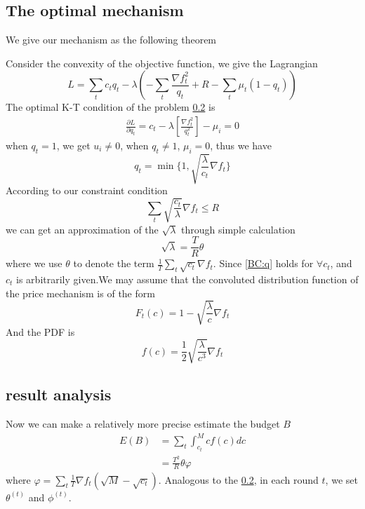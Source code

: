 \documentclass[10pt,conference,compsocconf,letterpaper]{IEEEtran}
\begin{document}
\subsection{The optimal mechanism}
We give our mechanism as the following theorem

\begin{IEEEproof}
Consider the convexity of the objective function, we give the Lagrangian
\begin{equation}
L=\sum_t c_t q_t -\lambda(-\sum_t\frac{\nabla f_t^2}{q_t}+R-\sum_t\mu_t(1-q_t))
\end{equation}
The optimal K-T condition of the problem \ref{} is 
\begin{align}
\frac{\partial L}{\partial q_t}=c_t-\lambda[\frac{\nabla f_t^2}{q_t^2}]-\mu_i=0
\end{align}
when $q_t=1$, we get $u_i\neq 0$, when $q_t\neq 1$, $\mu_i=0$, thus we have
\begin{equation}\label{BC:q}
q_t=\min\{1,\sqrt{\frac{\lambda}{c_t}}\nabla f_t\}
\end{equation}
According to our constraint condition
\begin{equation}
\sum_t \sqrt{\frac{c_t}{\lambda}}\nabla f_t\leq R
\end{equation}
we can get an approximation of the $\sqrt{\lambda}$ through simple calculation
\begin{equation}
\sqrt{\lambda}=\frac{T}{R}\theta
\end{equation}
where we use $\theta$ to denote the term $\frac{1}{T}\sum_t\sqrt{c_t}\nabla f_t$.
Since \ref{BC:q} holds for $\forall c_t$, and $c_t$ is arbitrarily given.We may assume that the convoluted distribution function of the price mechanism is of the form 
\begin{equation}
F_t(c)=1-\sqrt{\frac{\lambda}{c}}\nabla f_t
\end{equation}
And the PDF is 
\begin{equation}
f(c)=\frac{1}{2}\sqrt{\frac{{\lambda}}{c^3}}\nabla f_t
\end{equation}
\end{IEEEproof}
\subsection{result analysis}
Now we can make a relatively more precise estimate the budget $B$
\begin{align}
E(B)&=\sum_t\int_{c_t}^Mcf(c)dc\\
&=\frac{T^2}{R}\theta\varphi
\end{align}
where $\varphi=\sum_t\frac{1}{T}\nabla f_t(\sqrt{M}-\sqrt{c_t})$. Analogous to the \ref{}, in each round $t$, we set $\theta^{(t)}$ and $\phi^{(t)}$.
\end{document}
